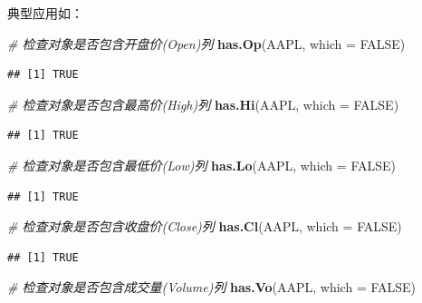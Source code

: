 \documentclass[]{ctexbook}
\newenvironment{Shaded}{\begin{snugshade}}{\end{snugshade}}
\newcommand{\AttributeTok}[1]{\textcolor[rgb]{0.13,0.29,0.53}{#1}}
\newcommand{\CommentTok}[1]{\textcolor[rgb]{0.56,0.35,0.01}{\textit{#1}}}
\newcommand{\ConstantTok}[1]{\textcolor[rgb]{0.56,0.35,0.01}{#1}}
\newcommand{\FunctionTok}[1]{\textcolor[rgb]{0.13,0.29,0.53}{\textbf{#1}}}
\newcommand{\NormalTok}[1]{#1}
\begin{document}
典型应用如：

\begin{Shaded}
\begin{Highlighting}[]
\CommentTok{\# 检查对象是否包含开盘价(Open)列}
\FunctionTok{has.Op}\NormalTok{(AAPL, }\AttributeTok{which =} \ConstantTok{FALSE}\NormalTok{)}
\end{Highlighting}
\end{Shaded}

\begin{verbatim}
## [1] TRUE
\end{verbatim}

\begin{Shaded}
\begin{Highlighting}[]
\CommentTok{\# 检查对象是否包含最高价(High)列}
\FunctionTok{has.Hi}\NormalTok{(AAPL, }\AttributeTok{which =} \ConstantTok{FALSE}\NormalTok{)}
\end{Highlighting}
\end{Shaded}

\begin{verbatim}
## [1] TRUE
\end{verbatim}

\begin{Shaded}
\begin{Highlighting}[]
\CommentTok{\# 检查对象是否包含最低价(Low)列}
\FunctionTok{has.Lo}\NormalTok{(AAPL, }\AttributeTok{which =} \ConstantTok{FALSE}\NormalTok{)}
\end{Highlighting}
\end{Shaded}

\begin{verbatim}
## [1] TRUE
\end{verbatim}

\begin{Shaded}
\begin{Highlighting}[]
\CommentTok{\# 检查对象是否包含收盘价(Close)列}
\FunctionTok{has.Cl}\NormalTok{(AAPL, }\AttributeTok{which =} \ConstantTok{FALSE}\NormalTok{)}
\end{Highlighting}
\end{Shaded}

\begin{verbatim}
## [1] TRUE
\end{verbatim}

\begin{Shaded}
\begin{Highlighting}[]
\CommentTok{\# 检查对象是否包含成交量(Volume)列}
\FunctionTok{has.Vo}\NormalTok{(AAPL, }\AttributeTok{which =} \ConstantTok{FALSE}\NormalTok{)}
\end{Highlighting}
\end{Shaded}
\end{document}
